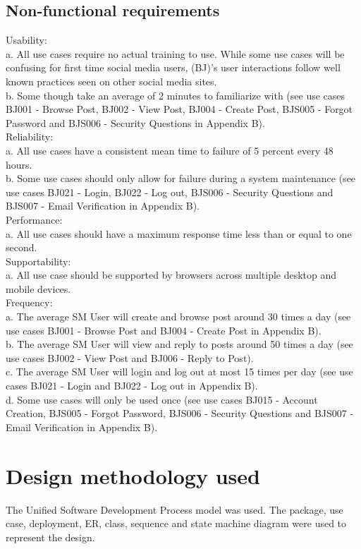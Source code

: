 \documentclass{report}
\begin{document}
	\subsection{Non-functional requirements}
	Usability: \\
		a.	All use cases require no actual training to use. While some use cases will be confusing for first time social media users, (BJ)’s user interactions follow well known practices seen on other social media sites.\\
		b.	Some though take an average of 2 minutes to familiarize with (see use cases BJ001 - Browse Post, BJ002 - View Post, BJ004 - Create Post, BJS005 - Forgot Password and BJS006 - Security Questions in Appendix B). \\
	Reliability: \\
		a.	All use cases have a consistent mean time to failure of 5 percent every 48 hours.\\
		b.	Some use cases should only allow for failure during a system maintenance (see use cases BJ021 - Login, BJ022 - Log out, BJS006 - Security Questions and BJS007 - Email Verification in Appendix B).\\
	Performance:\\ 
		a.	All use cases should have a maximum response time less than or equal to one second.\\
	Supportability: \\
		a.	All use case should be supported by browsers across multiple desktop and mobile devices.\\
	Frequency:\\
		a.	The average SM User will create and browse post around 30 times a day (see use cases BJ001 - Browse Post and BJ004 - Create Post in Appendix B).\\
		b.	The average SM User will view and reply to posts around 50 times a day (see use cases BJ002 - View Post and BJ006 - Reply to Post).\\
		c.	The average SM User will login and log out at most 15 times per day (see use cases BJ021 - Login and BJ022 - Log out in Appendix B).\\
		d.	Some use cases will only be used once (see use cases BJ015 - Account Creation, BJS005 - Forgot Password, BJS006 - Security Questions and BJS007 - Email Verification in Appendix B).\\
\section{Design methodology used} 
	The Unified Software Development Process model was used. The package, use case, deployment, ER, class, sequence and state machine diagram were used to represent the design.
\end{document}

